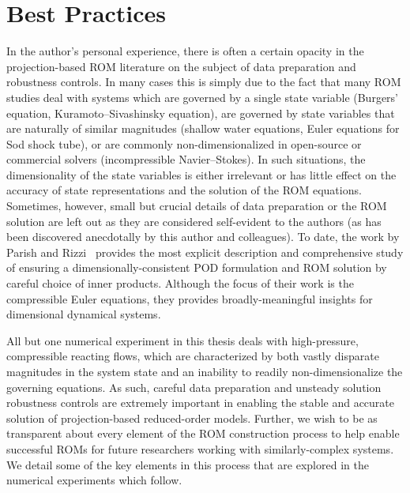 \section{Best Practices}

In the author's personal experience, there is often a certain opacity in the projection-based ROM literature on the subject of data preparation and robustness controls. In many cases this is simply due to the fact that many ROM studies deal with systems which are governed by a single state variable (Burgers' equation, Kuramoto--Sivashinsky equation), are governed by state variables that are naturally of similar magnitudes (shallow water equations, Euler equations for Sod shock tube), or are commonly non-dimensionalized in open-source or commercial solvers (incompressible Navier--Stokes). In such situations, the dimensionality of the state variables is either irrelevant or has little effect on the accuracy of state representations and the solution of the ROM equations. Sometimes, however, small but crucial details of data preparation or the ROM solution are left out as they are considered self-evident to the authors (as has been discovered anecdotally by this author and colleagues). To date, the work by Parish and Rizzi~\cite{Parish2022} provides the most explicit description and comprehensive study of ensuring a dimensionally-consistent POD formulation and ROM solution by careful choice of inner products. Although the focus of their work is the compressible Euler equations, they provides broadly-meaningful insights for dimensional dynamical systems.

All but one numerical experiment in this thesis deals with high-pressure, compressible reacting flows, which are characterized by both vastly disparate magnitudes in the system state and an inability to readily non-dimensionalize the governing equations. As such, careful data preparation and unsteady solution robustness controls are extremely important in enabling the stable and accurate solution of projection-based reduced-order models. Further, we wish to be as transparent about every element of the ROM construction process to help enable successful ROMs for future researchers working with similarly-complex systems. We detail some of the key elements in this process that are explored in the numerical experiments which follow.

